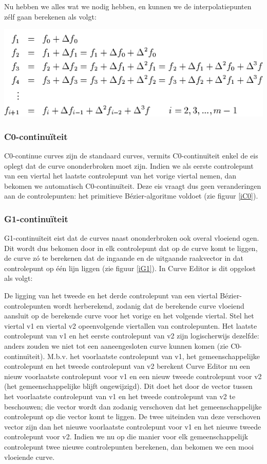 \documentclass[a4paper,11pt,oneside, titlepage]{article}
\begin{document}
Nu hebben we alles wat we nodig hebben, en kunnen we de interpolatiepunten z\'elf gaan berekenen als volgt:
\begin{center}
\includegraphics[scale=0.6]{diff6.png}
\end{center}
\subsubsection{C0-continu\"iteit \label{sc0}}
C0-continue curves zijn de standaard curves, vermits C0-continu\"iteit enkel de eis oplegt dat de curve ononderbroken moet zijn.
Indien we als eerste controlepunt van een viertal het laatste controlepunt van het vorige viertal nemen, dan bekomen we automatisch C0-continu\"iteit. Deze eis vraagt dus geen veranderingen aan de controlepunten: het primitieve
B\'ezier-algoritme voldoet (zie figuur \ref{iC0}).
\subsubsection{G1-continu\"iteit \label{sG1}}
G1-continu\"iteit eist dat de curves naast ononderbroken ook overal vloeiend ogen. Dit wordt dus bekomen door in elk controlepunt dat op de curve komt te liggen, de curve z\'o te berekenen dat de ingaande en de uitgaande raakvector
in dat controlepunt op \'e\'en lijn liggen (zie figuur \ref{iG1}). In Curve Editor is dit opgelost als volgt:

De ligging van het tweede en het derde controlepunt van een viertal B\'ezier-controlepunten wordt herberekend, zodanig dat de berekende curve vloeiend aansluit op de berekende curve voor het vorige en het volgende viertal. Stel het viertal v1 en viertal v2 opeenvolgende viertallen van controlepunten. Het laatste controlepunt van v1 en het eerste controlepunt van v2 zijn logischerwijs dezelfde: anders zouden we niet tot een aaneengesloten curve kunnen komen (zie C0-continu\"iteit). M.b.v. het voorlaatste controlepunt van v1, het gemeenschappelijke controlepunt en het tweede controlepunt van v2 berekent Curve Editor nu een nieuw voorlaatste controlepunt voor v1 en een nieuw tweede controlepunt voor v2 (het gemeenschappelijke blijft ongewijzigd). Dit doet het door de vector tussen het voorlaatste controlepunt van v1 en het tweede controlepunt van v2 te beschouwen; die vector wordt dan zodanig verschoven dat het gemeenschappelijke controlepunt op die vector komt te liggen. De twee uiteinden van deze verschoven vector zijn dan het nieuwe voorlaatste controlepunt voor v1 en het nieuwe tweede controlepunt voor v2. Indien we nu op die manier voor elk gemeenschappelijk controlepunt twee nieuwe controlepunten berekenen, dan bekomen we een mooi vloeiende curve.
\end{document}
